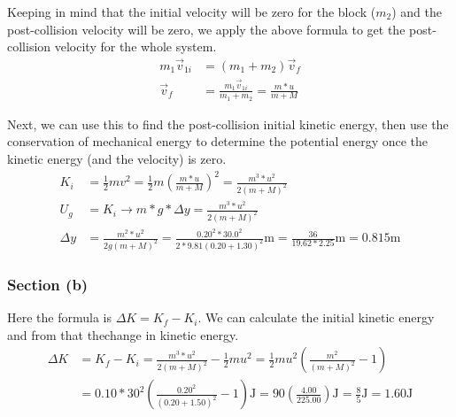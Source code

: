 \documentclass[12pt]{article}
\begin{document}
Keeping in mind that the initial velocity will be zero for the block ($m_2$) and the post-collision velocity will be zero, we apply the above formula to get the post-collision velocity for the whole system.
\begin{align*}
    m_1\vec{v}_{1i} &=  (m_1 + m_2)\vec{v}_{f}\\
    \vec{v}_{f} &=  \frac{m_1\vec{v}_{1i}}{m_1 + m_2} = \frac{m*u}{m+M}
\end{align*}

Next, we can use this to find the post-collision initial kinetic energy, then use the conservation of mechanical energy to determine the potential energy once the kinetic energy (and the velocity) is zero.
\begin{align*}
    K_i &=  \frac{1}{2}mv^2
        =   \frac{1}{2}m\left(\frac{m*u}{m+M}\right)^2
        =   \frac{m^3*u^2}{2(m+M)^2}\\
    U_g &=  K_i\rightarrow
    m*g*\Delta y    =  \frac{m^3*u^2}{2(m+M)^2}\\
    \Delta y    &=  \frac{m^2*u^2}{2g(m+M)^2}
        =   \frac{0.20^2*30.0^2}{2*9.81(0.20+1.30)^2}\unit{\meter}
        =   \frac{36}{19.62*2.25}\unit{\meter}
        =   \boxed{0.815\unit{\meter}}
\end{align*}

\pagebreak
\subsubsection*{Section (b)}
Here the formula is \( \Delta K = K_f - K_i \). We can calculate the initial kinetic energy and from that thechange in kinetic energy.
\begin{align*}
    \Delta K    &=  K_f - K_i
        =   \frac{m^3*u^2}{2(m+M)^2} - \frac{1}{2}mu^2
        =   \frac{1}{2}mu^2\left(\frac{m^2}{(m+M)^2} - 1\right)\\
        &=  0.10*30^2\left(\frac{0.20^2}{(0.20+1.50)^2} - 1\right) \unit{\joule}
        =   90\left(\frac{4.00}{225.00}\right) \unit{\joule}
        =   \boxed{\frac{8}{5} \unit{\joule} = 1.60 \unit{\joule}}
\end{align*}
\end{document}
